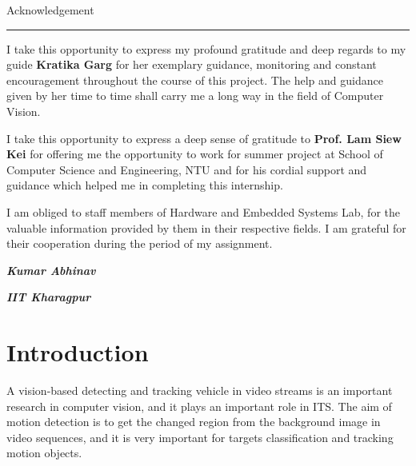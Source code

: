 \documentclass[a4paper,12pt]{article}
\begin{document}
	\newpage
	\begin{center}
		\vspace*{1in}
		{\LARGE Acknowledgement}
		\vspace{0.1in}
		\hrule
		\vspace{0.1in}
	\end{center}
	\vspace{0.25in}
	I take this opportunity to express my profound gratitude and deep regards to my guide \textbf{Kratika Garg} for her exemplary guidance, monitoring and constant encouragement throughout the course of this project. The help and guidance given by her time to time shall carry me a long way in the field of Computer Vision.
	\begin{flushleft}
	I take this opportunity to express a deep sense of gratitude to \textbf{Prof. Lam Siew Kei} for offering me the opportunity to work for summer project at School of Computer Science and Engineering, NTU and for his cordial support and guidance which helped me in completing this internship. 
	\end{flushleft}
	\begin{flushleft}
	I am obliged to staff members of Hardware and Embedded Systems Lab, for the valuable information provided by them in their respective fields. I am grateful for their cooperation during the period of my assignment.
	\end{flushleft}
	\vspace{2.5in}
	
	\begin{flushleft}
		\textbf{\textit{Kumar Abhinav}}
		\par
		\textbf{\textit{IIT Kharagpur}}
	\end{flushleft}


\tableofcontents

\newpage


\section{Introduction}

\vspace{0.1in}
A vision-based detecting and tracking vehicle in
video streams is an important research in computer
vision, and it plays an important role in ITS. The aim
of motion detection is to get the changed region from
the background image in video sequences, and it is
very important for targets classification and
tracking motion objects.
\end{document}

